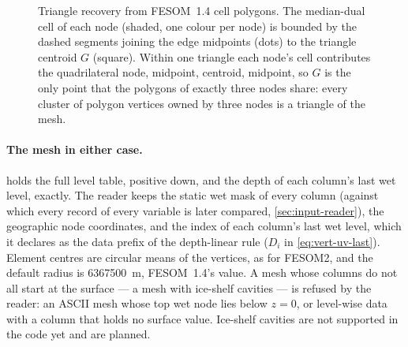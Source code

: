 \begin{figure}[t]
\centering
{}
\caption{Triangle recovery from FESOM~1.4 cell polygons. The median-dual cell of each node (shaded, one
colour per node) is bounded by the dashed segments joining the edge midpoints (dots) to the triangle
centroid $G$ (square). Within one triangle each node's cell contributes the quadrilateral node, midpoint,
centroid, midpoint, so $G$ is the only point that the polygons of exactly three nodes share: every cluster
of polygon vertices owned by three nodes is a triangle of the mesh.}
\label{fig:mesh-fesom14}
\end{figure}

\paragraph{The mesh in either case.}  holds the full level table, positive down, and
 the depth of each column's last wet level, exactly. The reader keeps the static wet mask
of every column (against which every record of every variable is later compared, \cref{sec:input-reader}),
the geographic node coordinates, and the index of each column's last wet level, which it declares as the
data prefix of the depth-linear rule ($D_i$ in \cref{eq:vert-uv-last}). Element centres are circular means
of the vertices, as for FESOM2, and the default radius is \SI{6367500}{\metre}, FESOM~1.4's value. A mesh
whose columns do not all start at the surface --- a mesh with ice-shelf cavities --- is refused by the
reader: an ASCII mesh whose top wet node lies below $z=0$, or level-wise data with a column that holds no
surface value. Ice-shelf cavities are not supported in the code yet and are planned.

